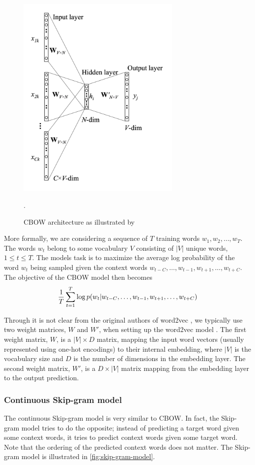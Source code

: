 \begin{figure}[ht]
    \centering
    \includegraphics[width=8cm]{thesis/figures/cbow-rong-2016.png}
    \caption{CBOW architecture as illustrated by \cite{rong2016word2vec}}.
    \label{fig:cbow-model}
\end{figure}

More formally, we are considering a sequence of $T$ training words $w_1, w_2, \ldots, w_T$. The words $w_t$ belong to some vocabulary $V$ consisting of $|V|$ unique words, $1 \leq t \leq T$. The models task is to maximize the average log probability of the word $w_t$ being sampled given the context words $w_{t-C}, \ldots, w_{t-1}, w_{t+1}, \ldots, w_{t+C}$. The objective of the CBOW model then becomes
\begin{align}
    \frac{1}{T} \sum\limits_{t=1}^{T} \log p(w_t | w_{t-C}, \ldots, w_{t-1}, w_{t+1}, \ldots, w_{t+C})
    \label{eqn:cbow-objective-function}
\end{align}

Through it is not clear from the original authors of word2vec \cite{mikolov2013a, mikolov2013b}, we typically use two weight matrices, $W$ and $W'$, when setting up the word2vec model \cite{rong2016word2vec}. The first weight matrix, $W$, is a $|V| \times D$ matrix, mapping the input word vectors (usually represented using one-hot encodings) to their internal embedding, where $|V|$ is the vocabulary size and $D$ is the number of dimensions in the embedding layer. The second weight matrix, $W'$, is a $D \times |V|$ matrix mapping from the embedding layer to the output prediction.

\subsubsection{Continuous Skip-gram model}
The continuous Skip-gram model is very similar to CBOW. In fact, the Skip-gram model tries to do the opposite; instead of predicting a target word given some context words, it tries to predict context words given some target word. Note that the ordering of the predicted context words does not matter. The Skip-gram model is illustrated in \cref{fig:skip-gram-model}.

